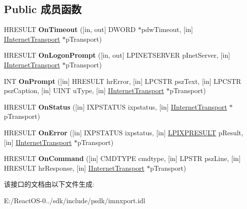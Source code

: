 \subsection*{Public 成员函数}
\begin{DoxyCompactItemize}
\item 
\mbox{\label{interface_i_transport_callback_a1ad57be24f193d4cf56a3160a13f2277}} 
H\+R\+E\+S\+U\+LT {\bfseries On\+Timeout} (\mbox{[}in, out\mbox{]} D\+W\+O\+RD $\ast$pdw\+Timeout, \mbox{[}in\mbox{]} \hyperlink{interface_i_internet_transport}{I\+Internet\+Transport} $\ast$p\+Transport)
\item 
\mbox{\label{interface_i_transport_callback_ab981927e57be4edf673de6ac28d2491e}} 
H\+R\+E\+S\+U\+LT {\bfseries On\+Logon\+Prompt} (\mbox{[}in, out\mbox{]} L\+P\+I\+N\+E\+T\+S\+E\+R\+V\+ER p\+Inet\+Server, \mbox{[}in\mbox{]} \hyperlink{interface_i_internet_transport}{I\+Internet\+Transport} $\ast$p\+Transport)
\item 
\mbox{\label{interface_i_transport_callback_a09ac5e1f2a184a006c8e38ddeab0d844}} 
I\+NT {\bfseries On\+Prompt} (\mbox{[}in\mbox{]} H\+R\+E\+S\+U\+LT hr\+Error, \mbox{[}in\mbox{]} L\+P\+C\+S\+TR psz\+Text, \mbox{[}in\mbox{]} L\+P\+C\+S\+TR psz\+Caption, \mbox{[}in\mbox{]} U\+I\+NT u\+Type, \mbox{[}in\mbox{]} \hyperlink{interface_i_internet_transport}{I\+Internet\+Transport} $\ast$p\+Transport)
\item 
\mbox{\label{interface_i_transport_callback_a7aaec083db91ba17ff8ef2b6578fc387}} 
H\+R\+E\+S\+U\+LT {\bfseries On\+Status} (\mbox{[}in\mbox{]} I\+X\+P\+S\+T\+A\+T\+US ixpstatus, \mbox{[}in\mbox{]} \hyperlink{interface_i_internet_transport}{I\+Internet\+Transport} $\ast$p\+Transport)
\item 
\mbox{\label{interface_i_transport_callback_a4e340e5e0876459218e941a955330a63}} 
H\+R\+E\+S\+U\+LT {\bfseries On\+Error} (\mbox{[}in\mbox{]} I\+X\+P\+S\+T\+A\+T\+US ixpstatus, \mbox{[}in\mbox{]} \hyperlink{struct_i_transport_callback_1_1tag_i_x_p_r_e_s_u_l_t}{L\+P\+I\+X\+P\+R\+E\+S\+U\+LT} p\+Result, \mbox{[}in\mbox{]} \hyperlink{interface_i_internet_transport}{I\+Internet\+Transport} $\ast$p\+Transport)
\item 
\mbox{\label{interface_i_transport_callback_a913ae160ea978b202430a5ba5a631457}} 
H\+R\+E\+S\+U\+LT {\bfseries On\+Command} (\mbox{[}in\mbox{]} C\+M\+D\+T\+Y\+PE cmdtype, \mbox{[}in\mbox{]} L\+P\+S\+TR psz\+Line, \mbox{[}in\mbox{]} H\+R\+E\+S\+U\+LT hr\+Response, \mbox{[}in\mbox{]} \hyperlink{interface_i_internet_transport}{I\+Internet\+Transport} $\ast$p\+Transport)
\end{DoxyCompactItemize}


该接口的文档由以下文件生成\+:\begin{DoxyCompactItemize}
\item 
E\+:/\+React\+O\+S-\/0../sdk/include/psdk/imnxport.\+idl\end{DoxyCompactItemize}
